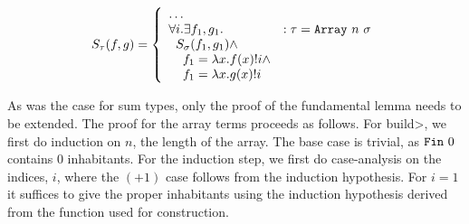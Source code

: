  \begin{equation}
    S_\tau(f, g) =
      \left\{
        \begin{array}{ll}
          \dots \\
          \forall i. \exists f_1, g_1.
            & : \tau = \texttt{Array}\ n\ \sigma \\
          \;\;S_\sigma(f_1, g_1) \wedge \\
          \;\;\;\;f_1 = \lambda x. f(x)!i \wedge \\
          \;\;\;\;f_1 = \lambda x. g(x)!i \\
        \end{array}
      \right.
  \label{eqn:lr_array}
  \end{equation}

  As was the case for sum types, only the proof of the fundamental lemma needs to be extended.
  The proof for the array terms proceeds as follows.
  For \<build>, we first do induction on $n$, the length of the array.
  The base case is trivial, as $\texttt{Fin}\ 0$ contains $0$ inhabitants.
  For the induction step, we first do case-analysis on the indices, $i$, where the $(+1)$ case follows from the induction hypothesis.
  For $i=1$ it suffices to give the proper inhabitants using the induction hypothesis derived from the function used for construction.
